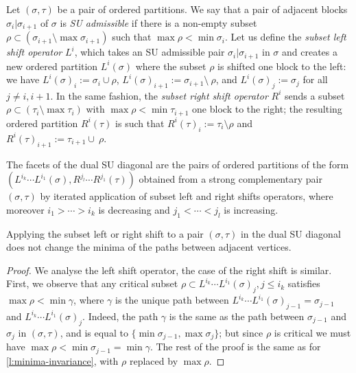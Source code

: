 Let $(\sigma,\tau)$ be a pair of ordered partitions.
We say that a pair of adjacent blocks $\sigma_i | \sigma_{i+1}$ of $\sigma$ is \emph{SU admissible} if there is a non-empty subset $\rho \subset (\sigma_{i+1} \setminus \max\sigma_{i+1})$ such that $\max \rho < \min \sigma_{i}$. 
Let us define the \emph{subset left shift operator} $L^i$, which takes an SU admissible pair $\sigma_i | \sigma_{i+1}$ in $\sigma$ and creates a new ordered partition $L^i(\sigma)$ where the subset $\rho$ is shifted one block to the left: we have $L^i(\sigma)_i := \sigma_i \cup \rho$, $L^i(\sigma)_{i+1} := \sigma_{i+1} \setminus \ \rho$, and $L^i(\sigma)_{j}:=\sigma_j$ for all $j\neq i, i+1$. 
In the same fashion, the \emph{subset right shift operator} $R^i$ sends a subset $\rho \subset (\tau_{i} \setminus \max\tau_{i})$ with $\max \rho < \min \tau_{i+1}$ one block to the right; the resulting ordered partition $R^i(\tau)$ is such that $R^i(\tau)_i := \tau_i \setminus \rho$ and $R^i(\tau)_{i+1} := \tau_{i+1} \cup \ \rho$.


\begin{definition}
    The facets of the dual SU diagonal are the pairs of ordered partitions of the form $(L^{i_k}\cdots L^{i_1}(\sigma), R^{j_l}\cdots R^{j_1}(\tau))$ obtained from a strong complementary pair $(\sigma,\tau)$ by iterated application of subset left and right shifts operators, where moreover $i_1 > \cdots > i_k$ is decreasing and $j_1 < \cdots < j_l$ is increasing. 
\end{definition}

\begin{lemma}
\label{l:minima-invariance-subset}
    Applying the subset left or right shift to a pair $(\sigma,\tau)$ in the dual SU diagonal does not change the minima of the paths between adjacent vertices. 
\end{lemma}

\begin{proof}
    We analyse the left shift operator, the case of the right shift is similar. 
    First, we observe that any critical subset $\rho \subset L^{i_k}\cdots L^{i_1}(\sigma)_j, j \leq i_k$ satisfies $\max \rho < \min \gamma$, where $\gamma$ is the unique path between $L^{i_k}\cdots L^{i_1}(\sigma)_{j-1}=\sigma_{j-1}$ and $L^{i_k}\cdots L^{i_1}(\sigma)_j$. 
    Indeed, the path $\gamma$ is the same as the path between $\sigma_{j-1}$ and $\sigma_{j}$ in $(\sigma,\tau)$, and is equal to $\{\min \sigma_{j-1}, \max \sigma_j\}$; but since $\rho$ is critical we must have $\max \rho < \min \sigma_{j-1}=\min \gamma$. 
    The rest of the proof is the same as for \cref{l:minima-invariance}, with $\rho$ replaced by $\max \rho$. 
\end{proof}

